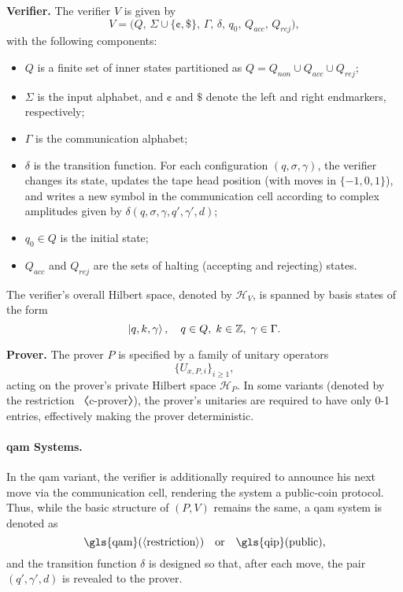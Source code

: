 \textbf{Verifier.} The verifier $V$ is given by
\[
V = \bigl(Q,\, \Sigma \cup \{\cent,\$\},\, \Gamma,\, \delta,\, q_0,\, Q_{acc},\, Q_{rej}\bigr),
\]
with the following components:
\begin{itemize}
  \item $Q$ is a finite set of inner states partitioned as $Q = Q_{non} \cup Q_{acc} \cup Q_{rej}$;
  \item $\Sigma$ is the input alphabet, and $\cent$ and $\$$ denote the left and right endmarkers, respectively;
  \item $\Gamma$ is the communication alphabet;
  \item $\delta$ is the transition function. For each configuration $(q,\sigma,\gamma)$, the verifier changes its state, updates the tape head position (with moves in $\{-1,0,1\}$), and writes a new symbol in the communication cell according to complex amplitudes given by $\delta(q,\sigma,\gamma,q',\gamma',d)$;
  \item $q_0\in Q$ is the initial state;
  \item $Q_{acc}$ and $Q_{rej}$ are the sets of halting (accepting and rejecting) states.
\end{itemize}
The verifier's overall Hilbert space, denoted by $\mathit{\mathcal{H}}_V$, is spanned by basis states of the form
\[
\ket{q, k, \gamma},\quad q\in Q,\; k\in \mathbb{Z},\; \gamma\in\Gamma.
\]

\textbf{Prover.} The prover $P$ is specified by a family of unitary operators
\[
\{U_{x,P,i}\}_{i\ge1},
\]
acting on the prover's private Hilbert space $\mathit{\mathcal{H}}_P$. In some variants (denoted by the restriction 〈c-prover〉), the prover's unitaries are required to have only 0-1 entries, effectively making the prover deterministic.

\paragraph{\gls{qam} Systems.} In the \gls{qam} variant, the verifier is additionally required to announce his next move via the communication cell, rendering the system a public-coin protocol. Thus, while the basic structure of $(P,V)$ remains the same, a \gls{qam} system is denoted as
\[
\text{\gls{qam}}(\langle\text{restriction}\rangle) \quad \text{or} \quad \text{\gls{qip}}(\text{public}),
\]
and the transition function $\delta$ is designed so that, after each move, the pair $(q',\gamma',d)$ is revealed to the prover.

